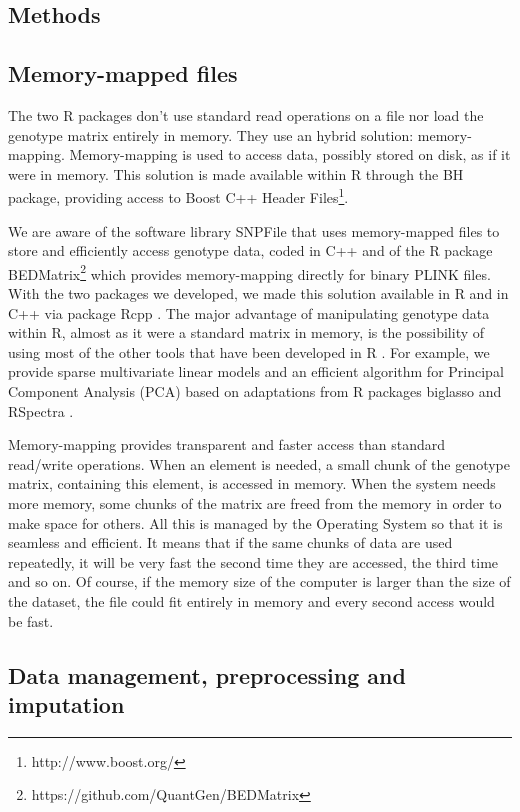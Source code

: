 \documentclass{bioinfo}
\begin{document}
\begin{methods}
\section{Methods}

\subsection{Memory-mapped files}

The two R packages don't use standard read operations on a file nor load the genotype matrix entirely in memory. They use an hybrid solution: memory-mapping. Memory-mapping is used to access data, possibly stored on disk, as if it were in memory. This solution is made available within R through the BH package, providing access to Boost C++ Header Files\footnote{http://www.boost.org/}.


We are aware of the software library SNPFile that uses memory-mapped files to store and efficiently access genotype data, coded in C++ \cite[]{Nielsen2008} and of the R package BEDMatrix\footnote{https://github.com/QuantGen/BEDMatrix} which provides memory-mapping directly for binary PLINK files. With the two packages we developed, we made this solution available in R and in C++ via package Rcpp \cite[]{Eddelbuettel2011}. The major advantage of manipulating genotype data within R, almost as it were a standard matrix in memory, is the possibility of using most of the other tools that have been developed in R \cite[]{R2017}. For example, we provide sparse multivariate linear models and an efficient algorithm for Principal Component Analysis (PCA) based on adaptations from R packages biglasso and RSpectra \cite[]{RSpectra2016,Zeng2017}.

Memory-mapping provides transparent and faster access than standard read/write operations. 
When an element is needed, a small chunk of the genotype matrix, containing this element, is accessed in memory. 
When the system needs more memory, some chunks of the matrix are freed from the memory in order to make space for others. 
All this is managed by the Operating System so that it is seamless and efficient. 
It means that if the same chunks of data are used repeatedly, it will be very fast the second time they are accessed, the third time and so on. 
Of course, if the memory size of the computer is larger than the size of the dataset, the file could fit entirely in memory and every second access would be fast. 


\subsection{Data management, preprocessing and imputation} \label{sec:preprocess}


\end{methods}
\end{document}
